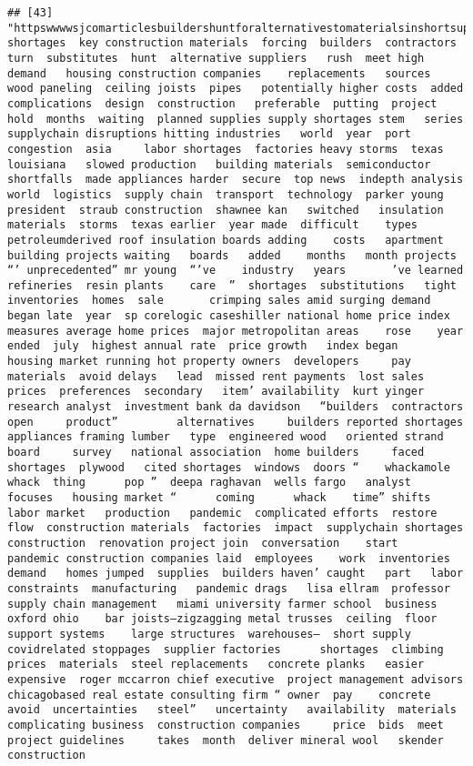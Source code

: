 \documentclass[
]{article}
\begin{document}
\begin{verbatim}
## [43] "httpswwwwsjcomarticlesbuildershuntforalternativestomaterialsinshortsupply shortages  key construction materials  forcing  builders  contractors  turn  substitutes  hunt  alternative suppliers   rush  meet high demand   housing construction companies    replacements   sources    wood paneling  ceiling joists  pipes   potentially higher costs  added complications  design  construction   preferable  putting  project  hold  months  waiting  planned supplies supply shortages stem   series  supplychain disruptions hitting industries   world  year  port congestion  asia     labor shortages  factories heavy storms  texas  louisiana   slowed production   building materials  semiconductor shortfalls  made appliances harder  secure  top news  indepth analysis   world  logistics  supply chain  transport  technology  parker young president  straub construction  shawnee kan   switched   insulation materials  storms  texas earlier  year made  difficult    types  petroleumderived roof insulation boards adding    costs   apartment building projects waiting   boards   added    months   month projects “’ unprecedented” mr young  “’ve    industry   years       ’ve learned   refineries  resin plants    care  ”  shortages  substitutions   tight inventories  homes  sale       crimping sales amid surging demand  began late  year  sp corelogic caseshiller national home price index  measures average home prices  major metropolitan areas    rose    year  ended  july  highest annual rate  price growth   index began     housing market running hot property owners  developers     pay    materials  avoid delays   lead  missed rent payments  lost sales  prices  preferences  secondary   item’ availability  kurt yinger  research analyst  investment bank da davidson   “builders  contractors   open     product”         alternatives     builders reported shortages  appliances framing lumber   type  engineered wood   oriented strand board     survey   national association  home builders     faced shortages  plywood   cited shortages  windows  doors “    whackamole    whack  thing      pop ”  deepa raghavan  wells fargo   analyst  focuses   housing market “      coming      whack    time” shifts   labor market   production   pandemic  complicated efforts  restore  flow  construction materials  factories  impact  supplychain shortages    construction  renovation project join  conversation    start   pandemic construction companies laid  employees    work  inventories  demand   homes jumped  supplies  builders haven’ caught   part   labor constraints  manufacturing   pandemic drags   lisa ellram  professor  supply chain management   miami university farmer school  business  oxford ohio    bar joists—zigzagging metal trusses  ceiling  floor support systems    large structures  warehouses—  short supply   covidrelated stoppages  supplier factories      shortages  climbing prices  materials  steel replacements   concrete planks   easier     expensive  roger mccarron chief executive  project management advisors   chicagobased real estate consulting firm “ owner  pay    concrete  avoid  uncertainties   steel”   uncertainty   availability  materials  complicating business  construction companies     price  bids  meet project guidelines     takes  month  deliver mineral wool   skender construction 
\end{verbatim}
\end{document}
